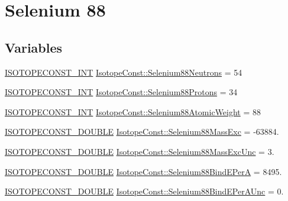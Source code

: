 \hypertarget{group___isotope_const-_selenium-_se88}{}\section{Selenium 88}
\label{group___isotope_const-_selenium-_se88}
\subsection*{Variables}
\begin{DoxyCompactItemize}
\item 
\mbox{\hyperlink{group___isotope_const-_macros_ga5f18360b3e99483a35c32d789e62621c}{I\+S\+O\+T\+O\+P\+E\+C\+O\+N\+S\+T\+\_\+\+I\+NT}} \mbox{\hyperlink{group___isotope_const-_selenium-_se88_gac2625f857c8cfb8e7ae88dd0457c03d9}{Isotope\+Const\+::\+Selenium88\+Neutrons}} = 54
\item 
\mbox{\hyperlink{group___isotope_const-_macros_ga5f18360b3e99483a35c32d789e62621c}{I\+S\+O\+T\+O\+P\+E\+C\+O\+N\+S\+T\+\_\+\+I\+NT}} \mbox{\hyperlink{group___isotope_const-_selenium-_se88_ga676d9ceb98f022b5d58b86a500754370}{Isotope\+Const\+::\+Selenium88\+Protons}} = 34
\item 
\mbox{\hyperlink{group___isotope_const-_macros_ga5f18360b3e99483a35c32d789e62621c}{I\+S\+O\+T\+O\+P\+E\+C\+O\+N\+S\+T\+\_\+\+I\+NT}} \mbox{\hyperlink{group___isotope_const-_selenium-_se88_gac3a62be54dada8111366838651f8f2c3}{Isotope\+Const\+::\+Selenium88\+Atomic\+Weight}} = 88
\item 
\mbox{\hyperlink{group___isotope_const-_macros_ga8f45a7272ce02c0b4c65c44636ed719a}{I\+S\+O\+T\+O\+P\+E\+C\+O\+N\+S\+T\+\_\+\+D\+O\+U\+B\+LE}} \mbox{\hyperlink{group___isotope_const-_selenium-_se88_ga8782da9c28f49346562f4471deefa4d7}{Isotope\+Const\+::\+Selenium88\+Mass\+Exc}} = -\/63884.
\item 
\mbox{\hyperlink{group___isotope_const-_macros_ga8f45a7272ce02c0b4c65c44636ed719a}{I\+S\+O\+T\+O\+P\+E\+C\+O\+N\+S\+T\+\_\+\+D\+O\+U\+B\+LE}} \mbox{\hyperlink{group___isotope_const-_selenium-_se88_ga6b768407c49508bc94162769946eb6ff}{Isotope\+Const\+::\+Selenium88\+Mass\+Exc\+Unc}} = 3.
\item 
\mbox{\hyperlink{group___isotope_const-_macros_ga8f45a7272ce02c0b4c65c44636ed719a}{I\+S\+O\+T\+O\+P\+E\+C\+O\+N\+S\+T\+\_\+\+D\+O\+U\+B\+LE}} \mbox{\hyperlink{group___isotope_const-_selenium-_se88_ga98170a140d5387dba92d55632ee6db7a}{Isotope\+Const\+::\+Selenium88\+Bind\+E\+PerA}} = 8495.
\item 
\mbox{\hyperlink{group___isotope_const-_macros_ga8f45a7272ce02c0b4c65c44636ed719a}{I\+S\+O\+T\+O\+P\+E\+C\+O\+N\+S\+T\+\_\+\+D\+O\+U\+B\+LE}} \mbox{\hyperlink{group___isotope_const-_selenium-_se88_ga29abd19e240b301c726711c34a23e379}{Isotope\+Const\+::\+Selenium88\+Bind\+E\+Per\+A\+Unc}} = 0.

\end{DoxyCompactItemize}

